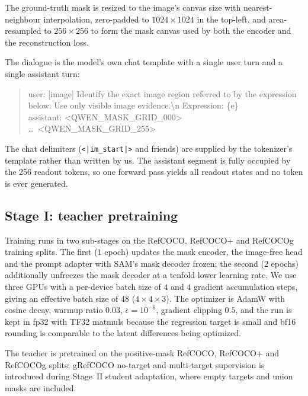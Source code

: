 The ground-truth mask is resized to the image's canvas size with nearest-neighbour interpolation, zero-padded to $1024\times1024$ in the top-left, and area-resampled to $256\times256$ to form the mask canvas used by both the encoder and the reconstruction loss.

The dialogue is the model's own chat template with a single user turn and a single assistant turn:
\begin{quote}\ttfamily\small
user: [image] Identify the exact image region referred to by the expression below. Use only visible image evidence.\textbackslash n Expression: \{e\}\\
assistant: <QWEN\_MASK\_GRID\_000> \dots\ <QWEN\_MASK\_GRID\_255>
\end{quote}
The chat delimiters (\texttt{<|im\_start|>} and friends) are supplied by the tokenizer's template rather than written by us. The assistant segment is fully occupied by the 256 readout tokens, so one forward pass yields all readout states and no token is ever generated.

\subsection{Stage I: teacher pretraining}
\label{sec:app_stage1}

Training runs in two sub-stages on the RefCOCO, RefCOCO+ and RefCOCOg training splits. The first ($1$ epoch) updates the mask encoder, the image-free head and the prompt adapter with SAM's mask decoder frozen; the second ($2$ epochs) additionally unfreezes the mask decoder at a tenfold lower learning rate. We use three GPUs with a per-device batch size of $4$ and $4$ gradient accumulation steps, giving an effective batch size of $48$ ($4\times4\times3$). The optimizer is AdamW with cosine decay, warmup ratio $0.03$, $\epsilon{=}10^{-6}$, gradient clipping $0.5$, and the run is kept in fp32 with TF32 matmuls because the regression target is small and bf16 rounding is comparable to the latent differences being optimized.

The teacher is pretrained on the positive-mask RefCOCO, RefCOCO+ and RefCOCOg splits; gRefCOCO no-target and multi-target supervision is introduced during Stage~II student adaptation, where empty targets and union masks are included.


